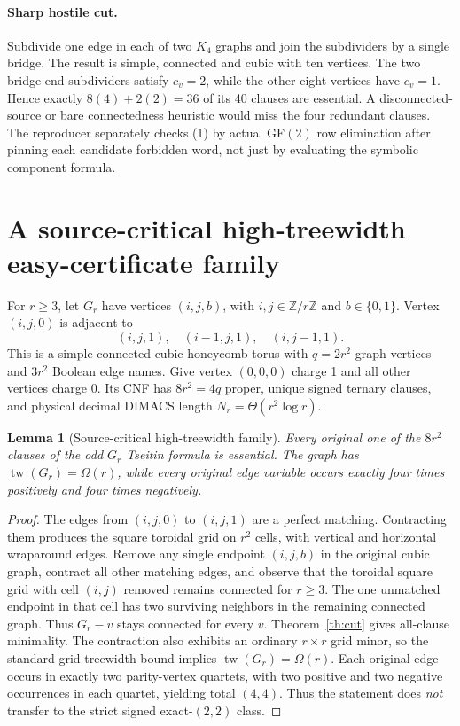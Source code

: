 \documentclass[11pt]{article}
\newtheorem{lemma}[theorem]{Lemma}
\begin{document}
\paragraph{Sharp hostile cut.} Subdivide one edge in each of two $K_4$ graphs and join the subdividers by a single bridge.  The result is simple, connected and cubic with ten vertices.  The two bridge-end subdividers satisfy $c_v=2$, while the other eight vertices have $c_v=1$.  Hence exactly $8(4)+2(2)=36$ of its 40 clauses are essential.  A disconnected-source or bare connectedness heuristic would miss the four redundant clauses.  The reproducer separately checks (1) by actual GF$(2)$ row elimination after pinning each candidate forbidden word, not just by evaluating the symbolic component formula.

\section{A source-critical high-treewidth easy-certificate family}
For $r\ge3$, let $G_r$ have vertices $(i,j,b)$, with $i,j\in\mathbb Z/r\mathbb Z$ and $b\in\{0,1\}$.  Vertex $(i,j,0)$ is adjacent to
\[
(i,j,1),\quad(i-1,j,1),\quad(i,j-1,1).
\tag{3}
\]
This is a simple connected cubic honeycomb torus with $q=2r^2$ graph vertices and $3r^2$ Boolean edge names.  Give vertex $(0,0,0)$ charge 1 and all other vertices charge 0.  Its CNF has $8r^2=4q$ proper, unique signed ternary clauses, and physical decimal DIMACS length $N_r=\Theta(r^2\log r)$.

\begin{lemma}[Source-critical high-treewidth family]\label{lem:honey}
Every original one of the $8r^2$ clauses of the odd $G_r$ Tseitin formula is essential.  The graph has $\operatorname{tw}(G_r)=\Omega(r)$, while every original edge variable occurs exactly four times positively and four times negatively.
\end{lemma}
\begin{proof}
The edges from $(i,j,0)$ to $(i,j,1)$ are a perfect matching.  Contracting them produces the square toroidal grid on $r^2$ cells, with vertical and horizontal wraparound edges.  Remove any single endpoint $(i,j,b)$ in the original cubic graph, contract all other matching edges, and observe that the toroidal square grid with cell $(i,j)$ removed remains connected for $r\ge3$.  The one unmatched endpoint in that cell has two surviving neighbors in the remaining connected graph.  Thus $G_r-v$ stays connected for every $v$.  Theorem~\ref{th:cut} gives all-clause minimality.  The contraction also exhibits an ordinary $r\times r$ grid minor, so the standard grid-treewidth bound implies $\operatorname{tw}(G_r)=\Omega(r)$.  Each original edge occurs in exactly two parity-vertex quartets, with two positive and two negative occurrences in each quartet, yielding total $(4,4)$.  Thus the statement does \emph{not} transfer to the strict signed exact-$(2,2)$ class.
\end{proof}
\end{document}
